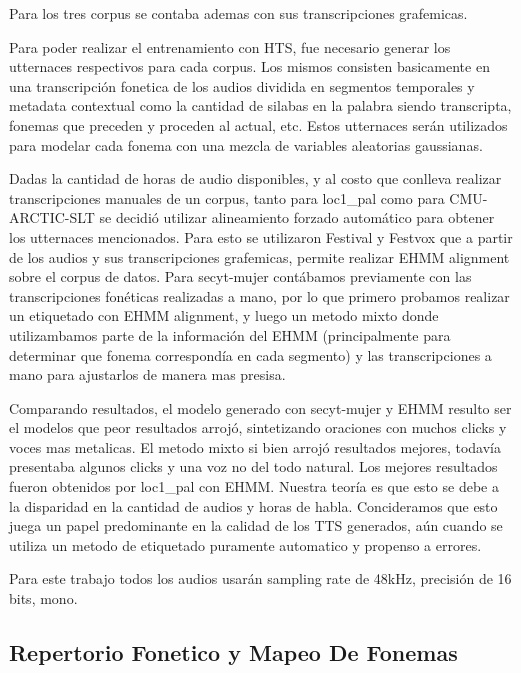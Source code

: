 Para los tres corpus se contaba ademas con sus transcripciones grafemicas. 

Para poder realizar el entrenamiento con HTS, fue necesario generar los utternaces respectivos para cada corpus. Los mismos consisten basicamente en una transcripción fonetica de los audios dividida en segmentos temporales y metadata contextual como la cantidad de silabas en la palabra siendo transcripta, fonemas que preceden y proceden al actual, etc. Estos utternaces serán utilizados para modelar cada fonema con una mezcla de variables aleatorias gaussianas. 

Dadas la cantidad de horas de audio disponibles, y al costo que conlleva realizar transcripciones manuales de un corpus, tanto para loc1\_pal como para CMU-ARCTIC-SLT se decidió utilizar alineamiento forzado automático para obtener los utternaces mencionados. Para esto se utilizaron Festival y Festvox que a partir de los audios y sus transcripciones grafemicas, permite realizar EHMM alignment sobre el corpus de datos. Para secyt-mujer contábamos previamente con las transcripciones fonéticas realizadas a mano, por lo que primero probamos realizar un etiquetado con EHMM alignment, y luego un metodo mixto donde utilizambamos parte de la información del EHMM (principalmente para determinar que fonema correspondía en cada segmento) y las transcripciones a mano para ajustarlos de manera mas presisa.

Comparando resultados, el modelo generado con secyt-mujer y EHMM resulto ser el modelos que peor resultados arrojó, sintetizando oraciones con muchos clicks y voces mas metalicas. El metodo mixto si bien arrojó resultados mejores, todavía presentaba algunos clicks y una voz no del todo natural. Los mejores resultados fueron obtenidos por loc1\_pal con EHMM. Nuestra teoría es que esto se debe a la disparidad en la cantidad de audios y horas de habla. Concideramos que esto juega un papel predominante en la calidad de los TTS generados, aún cuando se utiliza un metodo de etiquetado puramente automatico y propenso a errores.

Para este trabajo todos los audios usarán sampling rate de 48kHz, precisión de 16 bits, mono.


\subsection{Repertorio Fonetico y Mapeo De Fonemas}

